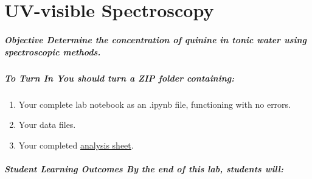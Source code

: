 \documentclass[]{tufte-book}
\providecommand{\tightlist}{%
  \setlength{\itemsep}{0pt}\setlength{\parskip}{0pt}}
\begin{document}
\hypertarget{uv-visible-spectroscopy}{%
\chapter{UV-visible Spectroscopy}\label{uv-visible-spectroscopy}}

\hypertarget{objective-determine-the-concentration-of-quinine-in-tonic-water-using-spectroscopic-methods.}{%
\paragraph{\texorpdfstring{\textbf{Objective} \textbar{} Determine the concentration of quinine in tonic water using spectroscopic methods.}{Objective \textbar{} Determine the concentration of quinine in tonic water using spectroscopic methods.}}\label{objective-determine-the-concentration-of-quinine-in-tonic-water-using-spectroscopic-methods.}}

\hypertarget{to-turn-in-you-should-turn-a-zip-folder-containing-1}{%
\paragraph{\texorpdfstring{\textbf{To Turn In} \textbar{} You should turn a ZIP folder containing:}{To Turn In \textbar{} You should turn a ZIP folder containing:}}\label{to-turn-in-you-should-turn-a-zip-folder-containing-1}}

\begin{enumerate}
\def\labelenumi{\arabic{enumi}.}
\tightlist
\item
  Your complete lab notebook as an .ipynb file, functioning with no errors.\\
\item
  Your data files.\\
\item
  Your completed \href{https://github.com/alphonse/alphonse.github.io/raw/master/devel/chem370/assignments/excel-templates/lab1_uv-vis_data-analysis.xlsx}{analysis sheet}.
\end{enumerate}

\hypertarget{student-learning-outcomes-by-the-end-of-this-lab-students-will-1}{%
\paragraph{\texorpdfstring{\textbf{Student Learning Outcomes} \textbar{} \emph{By the end of this lab, students will:}}{Student Learning Outcomes \textbar{} By the end of this lab, students will:}}\label{student-learning-outcomes-by-the-end-of-this-lab-students-will-1}}
\end{document}
